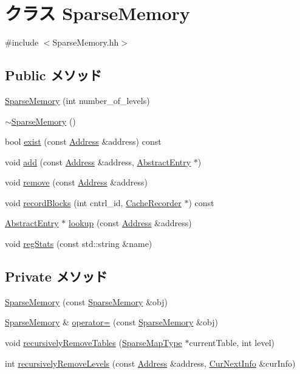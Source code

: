 \hypertarget{classSparseMemory}{
\section{クラス SparseMemory}
\label{classSparseMemory}
}


{\ttfamily \#include $<$SparseMemory.hh$>$}\subsection*{Public メソッド}
\begin{DoxyCompactItemize}
\item 
\hyperlink{classSparseMemory_a8e670627f220953e5f45aa5308bdeb4f}{SparseMemory} (int number\_\-of\_\-levels)
\item 
\hyperlink{classSparseMemory_a5c1f4b825e7960e579acfd4ac79675c6}{$\sim$SparseMemory} ()
\item 
bool \hyperlink{classSparseMemory_a0035c3b58922453aa4b25cc73e4ef27a}{exist} (const \hyperlink{classAddress}{Address} \&address) const 
\item 
void \hyperlink{classSparseMemory_aceb8ef4c1228ddad10036f5e59d61ea9}{add} (const \hyperlink{classAddress}{Address} \&address, \hyperlink{classAbstractEntry}{AbstractEntry} $\ast$)
\item 
void \hyperlink{classSparseMemory_a8cae1419257c78d90715dd87697f9f74}{remove} (const \hyperlink{classAddress}{Address} \&address)
\item 
void \hyperlink{classSparseMemory_a1ab3ef5742c0c4238f90e41d8959603c}{recordBlocks} (int cntrl\_\-id, \hyperlink{classCacheRecorder}{CacheRecorder} $\ast$) const 
\item 
\hyperlink{classAbstractEntry}{AbstractEntry} $\ast$ \hyperlink{classSparseMemory_a4cc0abbaa49ab392d18c2f34d87afeb2}{lookup} (const \hyperlink{classAddress}{Address} \&address)
\item 
void \hyperlink{classSparseMemory_a3dd3443357312bcb75580eaa508c48a4}{regStats} (const std::string \&name)
\end{DoxyCompactItemize}
\subsection*{Private メソッド}
\begin{DoxyCompactItemize}
\item 
\hyperlink{classSparseMemory_a4185cf6bae110327c9ce0225a731a7a8}{SparseMemory} (const \hyperlink{classSparseMemory}{SparseMemory} \&obj)
\item 
\hyperlink{classSparseMemory}{SparseMemory} \& \hyperlink{classSparseMemory_a4e634becbab6915935553a70f5714742}{operator=} (const \hyperlink{classSparseMemory}{SparseMemory} \&obj)
\item 
void \hyperlink{classSparseMemory_a9a883632739ed6248cebecc6e3fedc00}{recursivelyRemoveTables} (\hyperlink{SparseMemory_8hh_a93e9b04c329a9452d20206c8e31a4172}{SparseMapType} $\ast$currentTable, int level)
\item 
int \hyperlink{classSparseMemory_aa9e999fef6a14d51d503586d9723de5b}{recursivelyRemoveLevels} (const \hyperlink{classAddress}{Address} \&address, \hyperlink{structCurNextInfo}{CurNextInfo} \&curInfo)
\end{DoxyCompactItemize}
